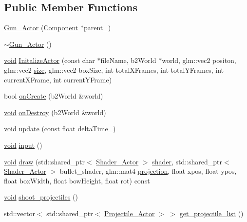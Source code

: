 \subsection*{Public Member Functions}
\begin{DoxyCompactItemize}
\item 
\hyperlink{classGun__Actor_afd0e2b7b3e6aa2606a7c82b093ba61ec}{Gun\+\_\+\+Actor} (\hyperlink{classComponent}{Component} $\ast$parent\+\_\+)
\item 
\hyperlink{classGun__Actor_a571f2e9d82ff8de46951bfc4eda8a21a}{$\sim$\+Gun\+\_\+\+Actor} ()
\item 
\hyperlink{imgui__impl__opengl3__loader_8h_ac668e7cffd9e2e9cfee428b9b2f34fa7}{void} \hyperlink{classGun__Actor_a67441e510402f639e72b1cbef279e275}{Initalize\+Actor} (const char $\ast$file\+Name, b2\+World $\ast$world, glm\+::vec2 positon, glm\+::vec2 \hyperlink{imgui__impl__opengl3__loader_8h_a3d1e3edfcf61ca2d831883e1afbad89e}{size}, glm\+::vec2 box\+Size, int total\+X\+Frames, int total\+Y\+Frames, int current\+X\+Frame, int current\+Y\+Frame)
\item 
bool \hyperlink{classGun__Actor_afd8cf48e6c4a2371b0b00d6ba5dd0392}{on\+Create} (b2\+World \&world)
\item 
\hyperlink{imgui__impl__opengl3__loader_8h_ac668e7cffd9e2e9cfee428b9b2f34fa7}{void} \hyperlink{classGun__Actor_a75a41d18a0217acbc38bc65c4578d33c}{on\+Destroy} (b2\+World \&world)
\item 
\hyperlink{imgui__impl__opengl3__loader_8h_ac668e7cffd9e2e9cfee428b9b2f34fa7}{void} \hyperlink{classGun__Actor_ab5e7b6b7032e1f0353c6c4f08cedebec}{update} (const float delta\+Time\+\_\+)
\item 
\hyperlink{imgui__impl__opengl3__loader_8h_ac668e7cffd9e2e9cfee428b9b2f34fa7}{void} \hyperlink{classGun__Actor_a71644f2f094ac3d33fd8018c4290f46a}{input} ()
\item 
\hyperlink{imgui__impl__opengl3__loader_8h_ac668e7cffd9e2e9cfee428b9b2f34fa7}{void} \hyperlink{classGun__Actor_a79adbc60417d353f22f0f21653cc0e60}{draw} (std\+::shared\+\_\+ptr$<$ \hyperlink{classShader__Actor}{Shader\+\_\+\+Actor} $>$ \hyperlink{imgui__impl__opengl3__loader_8h_a57b2a96adb1d51204909a82d861e395e}{shader}, std\+::shared\+\_\+ptr$<$ \hyperlink{classShader__Actor}{Shader\+\_\+\+Actor} $>$ bullet\+\_\+shader, glm\+::mat4 \hyperlink{main__menu__state_8cpp_a565d92bfbcc4a481d2d35f3850a382f7}{projection}, float xpos, float ypos, float box\+Width, float bow\+Height, float rot) const
\item 
\hyperlink{imgui__impl__opengl3__loader_8h_ac668e7cffd9e2e9cfee428b9b2f34fa7}{void} \hyperlink{classGun__Actor_aa28e6b811ff8d9348693c01baba1c513}{shoot\+\_\+projectiles} ()
\item 
std\+::vector$<$ std\+::shared\+\_\+ptr$<$ \hyperlink{classProjectile__Actor}{Projectile\+\_\+\+Actor} $>$ $>$ \hyperlink{classGun__Actor_ac24b6aa92132d453ce19eee3c1b0e5e2}{get\+\_\+projectile\+\_\+list} ()
\end{DoxyCompactItemize}
